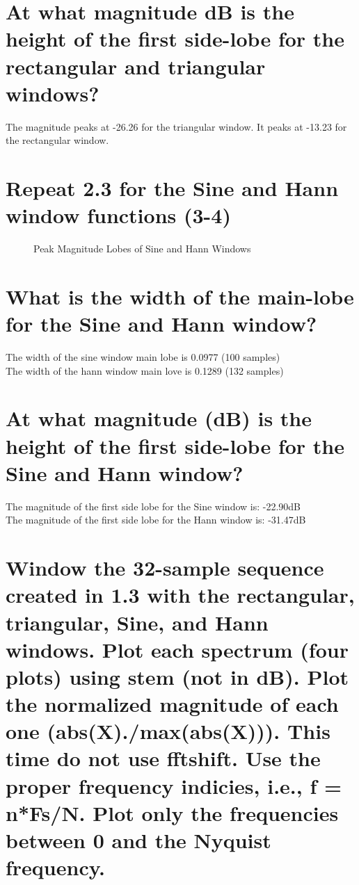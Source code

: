 \documentclass[titlepage]{scrartcl}
\begin{document}
\section{At what magnitude dB is the height of the first side-lobe for the
rectangular and triangular windows?}
The magnitude peaks at -26.26 for the triangular window. It peaks at -13.23 for
the rectangular window.

\section{Repeat 2.3 for the Sine and Hann window functions (3-4)}
\begin{figure}[H]
    \caption{Peak Magnitude Lobes of Sine and Hann Windows}
    \label{SineHannDFT}
\end{figure}

\section{What is the width of the main-lobe for the Sine and Hann window?}
The width of the sine window main lobe is 0.0977 (100 samples)\\
The width of the hann window main love is 0.1289 (132 samples)

\section{At what magnitude (dB) is the height of the first side-lobe for the
Sine and
Hann window?}
The magnitude of the first side lobe for the Sine window is: -22.90dB\\
The magnitude of the first side lobe for the Hann window is: -31.47dB

\section{Window the 32-sample sequence created in 1.3 with the rectangular,
triangular, Sine, and Hann windows. Plot each spectrum (four plots) using
stem (not in dB). Plot the normalized magnitude of each one
(abs(X)./max(abs(X))). This time do not use fftshift. Use the proper
frequency indicies, i.e., f = n*Fs/N. Plot only the frequencies between 0 and
the Nyquist frequency.}
\end{document}
